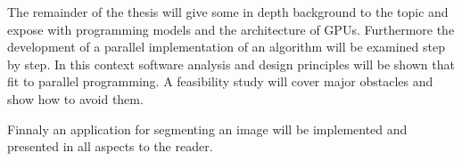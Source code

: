 The remainder of the thesis will give some in depth background to the topic and
expose with programming models and the architecture of GPUs. Furthermore the
development of a parallel implementation of an algorithm will be examined step
by step. In this context software analysis and design principles will be shown
that fit to parallel programming. A feasibility study will cover major obstacles
and show how to avoid them.

Finnaly an application for segmenting an image will be implemented and presented
in all aspects to the reader.
